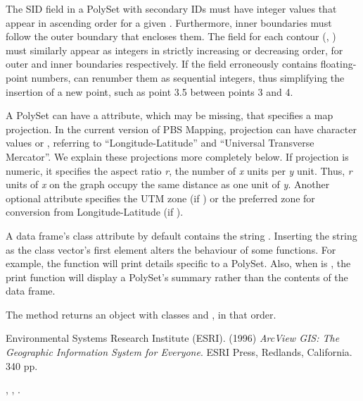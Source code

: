 \documentclass[letterpaper]{book}
\begin{document}
\begin{Details}
The SID field in a PolySet with secondary IDs must have integer values
that appear in ascending order for a given . Furthermore,
inner boundaries must follow the outer boundary that encloses them. The
 field for each contour (, ) must
similarly appear as integers in strictly increasing or decreasing order,
for outer and inner boundaries respectively. If the  field
erroneously contains floating-point numbers,  can
renumber them as sequential integers, thus simplifying the insertion of
a new point, such as point 3.5 between points 3 and 4.

A PolySet can have a  attribute, which may be missing,
that specifies a map projection. In the current version of PBS Mapping,
projection can have character values  or ,
referring to ``Longitude-Latitude'' and ``Universal
Transverse Mercator''. We explain these projections more completely
below. If projection is numeric, it specifies the aspect ratio \emph{r},
the number of \emph{x} units per \emph{y} unit. Thus, \emph{r} units of
\emph{x} on the graph occupy the same distance as one unit of
\emph{y}. Another optional attribute  specifies the UTM zone
(if ) or the preferred zone for conversion from
Longitude-Latitude (if ).

A data frame's class attribute by default contains the string
. Inserting the string  as the class
vector's first element alters the behaviour of some functions. For
example, the  function will print details specific
to a PolySet. Also, when  is , the
print function will display a PolySet's summary rather than the contents
of the data frame.
\end{Details}
%
\begin{Value}
The  method returns an object with classes
 and , in that order.
\end{Value}
%
\begin{References}\relax
Environmental Systems Research Institute (ESRI). (1996) \emph{ArcView GIS:
The Geographic Information System for Everyone}. ESRI Press, Redlands,
California. 340 pp.
\end{References}
%
\begin{SeeAlso}\relax
{},
,
.
\end{SeeAlso}
\end{document}
